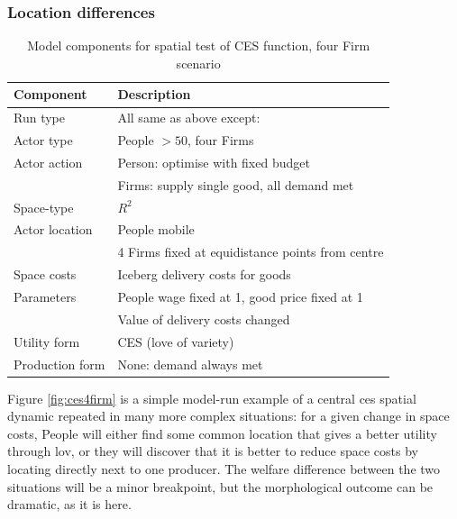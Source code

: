 \subsubsection{Location differences \label{sec:CESloc}}

%
\renewcommand{\arraystretch}{1.2}
\begin{table}[!hbt]
\begin{center}

\begin{tabular}{|l|l|}
\hline 
\textbf{Component} & \textbf{Description}\\
\hline
Run type & All same as above except:\\
\hline
Actor type & People $> 50$, four Firms \\
\hline
Actor action & Person: optimise with fixed budget\\
& Firms: supply single good, all demand met\\
\hline
Space-type & $R^2$\\
\hline
Actor location & People mobile\\ 
& 4 Firms fixed at equidistance points from centre\\
\hline
Space costs & Iceberg delivery costs for goods\\
\hline
Parameters & People wage fixed at 1, good price fixed at 1\\
& Value of delivery costs changed\\
\hline
Utility form & CES (love of variety)\\
\hline
Production form & None: demand always met\\
\hline

\end{tabular}

\caption{Model components for spatial test of CES function, four Firm scenario \label{tab:cesspatial2}}
\end{center}
\end{table}


Figure \ref{fig:ces4firm} is a simple model-run example of a central \gls{ces} spatial dynamic repeated in many more complex situations: for a given change in space costs, People will either find some common location that gives a better utility through \gls{lov}, or they will discover that it is better to reduce space costs by locating directly next to one producer. The welfare difference between the two situations will be a minor breakpoint, but the morphological outcome can be dramatic, as it is here. 

